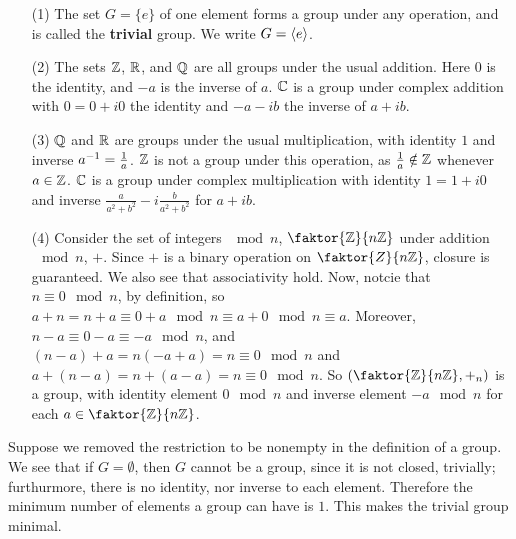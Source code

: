 \begin{example}
    \begin{enumerate}
        \item[(1)] The set $G=\{e\}$ of one element forms a group under any
            operation, and is called the \textbf{trivial} group. We write
            $G=\langle e\rangle$.

        \item[(2)] The sets $\mathbb{Z}$,  $\mathbb{R}$, and  $\mathbb{Q}$ are all groups under the
            usual addition. Here $0$ is the identity, and  $-a$ is the inverse
            of  $a$.  $\mathbb{C}$ is a group under complex addition with $0=0+i0$ the
            identity and $-a-ib$ the inverse of $a+ib$.

        \item[(3)] $\mathbb{Q}$ and  $\mathbb{R}$ are groups under the usual multiplication,
            with identity  $1$ and inverse  $a^{-1}=\frac{1}{a}$. $\mathbb{Z}$ is not a
            group under this operation, as  $\frac{1}{a} \notin \mathbb{Z}$ whenever $a
            \in \mathbb{Z}$.  $\mathbb{C}$ is a group under complex multiplication with identity
             $1=1+i0$ and inverse $\frac{a}{a^2+b^2}-i\frac{b}{a^2+b^2}$ for
             $a+ib$.

         \item[(4)] Consider the set of integers $\mod{n}$, $\faktor{\Z}{n\Z}$
             under addition  $\mod{n}$, $+$. Since  $+$ is a binary operation on
             $\faktor{Z}{n\Z}$, closure is guaranteed. We also see that
             associativity hold. Now, notcie that $n \equiv 0 \mod{n}$, by
             definition, so $a+n=n+a \equiv 0+a \mod{n} \equiv a+0 \mod{n}
             \equiv a$. Moreover, $n-a \equiv 0-a \equiv -a \mod{n}$, and
             $(n-a)+a=n(-a+a)=n \equiv 0 \mod{n}$ and $a+(n-a)=n+(a-a)=n \equiv
             0 \mod{n}$. So $(\faktor{\Z}{n\Z}, +_n)$ is a group, with identity
             element $0 \mod{n}$ and inverse element $-a \mod{n}$ for each $a
             \in \faktor{\Z}{n\Z}$.
    \end{enumerate}
\end{example}

\begin{example}
    Suppose we removed the restriction to be nonempty in the definition of a
    group. We see that if $G=\emptyset$, then  $G$ cannot be a group, since it
    is not closed, trivially; furthurmore, there is no identity, nor inverse to
    each element. Therefore the minimum number of elements a group can have is
    $1$. This makes the trivial group minimal.
\end{example}

